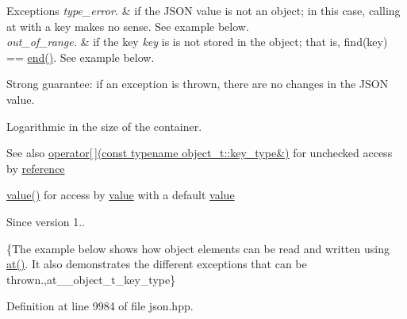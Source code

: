 \begin{DoxyExceptions}{Exceptions}
{\em type\+\_\+error.} & if the J\+S\+ON value is not an object; in this case, calling {\ttfamily at} with a key makes no sense. See example below. \\
\hline
{\em out\+\_\+of\+\_\+range.} & if the key {\itshape key} is is not stored in the object; that is, {\ttfamily find(key) == \hyperlink{classnlohmann_1_1basic__json_a13e032a02a7fd8a93fdddc2fcbc4763c}{end()}}. See example below.\\
\hline
\end{DoxyExceptions}
Strong guarantee\+: if an exception is thrown, there are no changes in the J\+S\+ON value.

Logarithmic in the size of the container.

\begin{DoxySeeAlso}{See also}
\hyperlink{classnlohmann_1_1basic__json_a233b02b0839ef798942dd46157cc0fe6}{operator\mbox{[}$\,$\mbox{]}(const typename object\+\_\+t\+::key\+\_\+type\&)} for unchecked access by \hyperlink{classnlohmann_1_1basic__json_ac6a5eddd156c776ac75ff54cfe54a5bc}{reference} 

\hyperlink{classnlohmann_1_1basic__json_a9fa223b26419f018f9b18cc516e3a8e5}{value()} for access by \hyperlink{classnlohmann_1_1basic__json_a9fa223b26419f018f9b18cc516e3a8e5}{value} with a default \hyperlink{classnlohmann_1_1basic__json_a9fa223b26419f018f9b18cc516e3a8e5}{value}
\end{DoxySeeAlso}
\begin{DoxySince}{Since}
version 1..
\end{DoxySince}
\{The example below shows how object elements can be read and written using {\ttfamily \hyperlink{classnlohmann_1_1basic__json_a73ae333487310e3302135189ce8ff5d8}{at()}}. It also demonstrates the different exceptions that can be thrown.,at\+\_\+\+\_\+object\+\_\+t\+\_\+key\+\_\+type\} 

Definition at line 9984 of file json.\+hpp.

